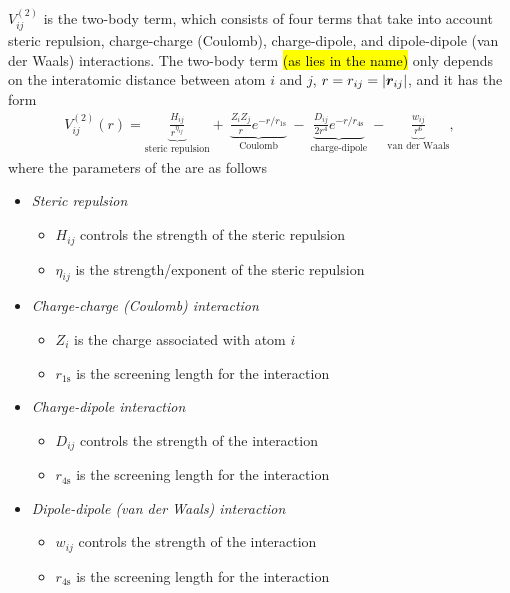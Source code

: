 $V_{ij}^{(2)}$ is the two-body term, which consists of four terms that take into account steric repulsion, charge-charge (Coulomb), charge-dipole, and dipole-dipole (van der Waals) interactions. The two-body term \hl{(as lies in the name)} only depends on the interatomic distance between atom $i$ and $j$, $r = r_{ij} = |\boldsymbol{r}_{ij}|$, and it has the form%
\begin{align*}
    V_{ij}^{(2)} (r) = 
    \underbrace{
        \frac{H_{ij}}{r^{\eta_{ij}}}
    }_{\text{steric repulsion}}
    +~ 
    \underbrace{
        \frac{Z_iZ_j}{r}e^{-r/r_{1\text{s}}}
    }_{\text{Coulomb}}
    ~-~
    \underbrace{
        \frac{D_{ij}}{2r^4}e^{-r/r_{4\text{s}}}
    }_{\text{charge-dipole}}
    ~- 
    \underbrace{
        \frac{w_{ij}}{r^6}
    }_{\text{van der Waals}}
    ,
\end{align*}%
where the parameters of the are as follows%
\begin{itemize}[%
    leftmargin=*,%
    label={}%
]
    \item \textit{Steric repulsion}
    \begin{itemize}[label=$\bullet$]
        \item $H_{ij}$ controls the strength of the steric repulsion
        \item $\eta_{ij}$ is the strength/exponent of the steric repulsion
    \end{itemize}
    \item \textit{Charge-charge (Coulomb) interaction}
    \begin{itemize}[label=$\bullet$]
        \item $Z_i$ is the charge associated with atom $i$
        \item $r_{1\text{s}}$ is the screening length for the interaction
    \end{itemize}
    \item \textit{Charge-dipole interaction}
    \begin{itemize}[label=$\bullet$]
        \item $D_{ij}$ controls the strength of the interaction
        \item $r_{4\text{s}}$ is the screening length for the interaction
    \end{itemize}
    \item \textit{Dipole-dipole (van der Waals) interaction}
    \begin{itemize}[label=$\bullet$]
        \item $w_{ij}$ controls the strength of the interaction
        \item $r_{4\text{s}}$ is the screening length for the interaction
    \end{itemize}
\end{itemize}

